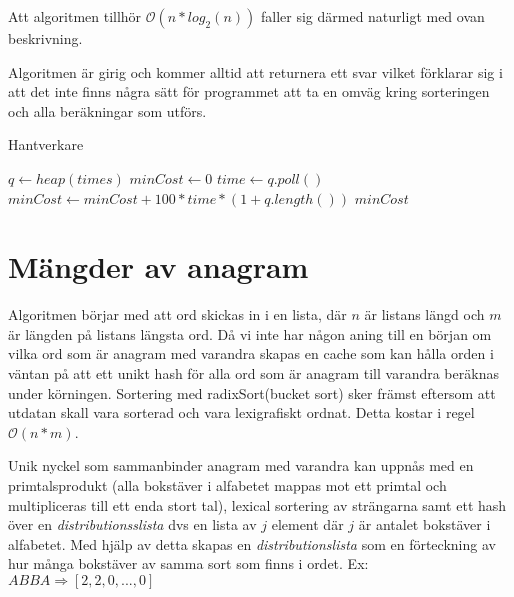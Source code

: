 \documentclass[a4paper,11pt,twoside]{article}
\begin{document}
Att algoritmen tillhör $\mathcal{O}(n*log_2(n))$ faller sig därmed naturligt med ovan beskrivning.

Algoritmen är girig och kommer alltid att returnera ett svar vilket förklarar sig i att det inte finns några sätt för programmet att ta en omväg kring sorteringen och alla beräkningar som utförs.

\begin{algorithm}
\caption{Hantverkare}
\begin{algorithmic}[1]

\State $q \gets heap(times)$ 
    \State $minCost \gets 0$ 
     
      \State $time \gets q.poll()$ 
        \State $minCost \gets minCost + 100 * time * (1 + q.length())$ 
    \EndWhile    
    \State \Return $minCost$
\EndFunction
\end{algorithmic}
\end{algorithm}

\newpage

\newpage
\section{Mängder av anagram}
Algoritmen börjar med att ord skickas in i en lista, där $n$ är listans längd och $m$ är längden på listans längsta ord.
Då vi inte har någon aning till en början om vilka ord som är anagram med varandra skapas en cache som kan hålla orden i väntan på att ett unikt hash för alla ord som är anagram till varandra beräknas under körningen. Sortering med radixSort(bucket sort) sker främst eftersom att utdatan skall vara sorterad och vara lexigrafiskt ordnat. Detta kostar i regel $\mathcal{O}(n*m)$.

Unik nyckel som sammanbinder anagram med varandra kan uppnås med en primtalsprodukt (alla bokstäver i alfabetet mappas mot ett primtal och multipliceras till ett enda stort tal), lexical sortering av strängarna samt ett hash över en \textit{distributionsslista} dvs en lista av $j$ element där $j$ är antalet bokstäver i alfabetet. Med hjälp av detta skapas en \textit{distributionslista} som en förteckning av hur många bokstäver av samma sort som finns i ordet.
Ex: $ \textit{ABBA} \Rightarrow [2,2,0,...,0]$
\end{document}
